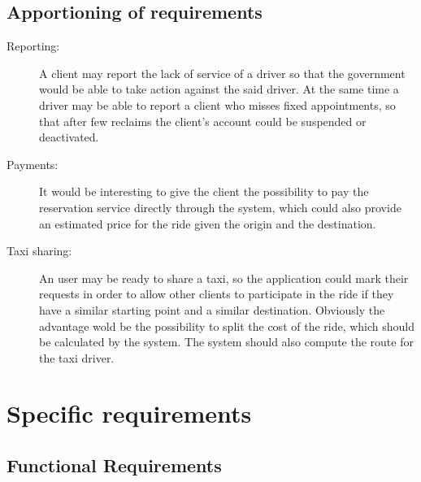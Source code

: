 \documentclass[a4paper]{article}
\let\stdsection\section
\renewcommand\section{\newpage\stdsection}
\begin{document}
\subsection{Apportioning of requirements}
\begin{description}
\item[Reporting:] A client may report the lack of service of a driver so that the government would be able to take action against the said driver. At the same time a driver may be able to report a client who misses fixed appointments, so that after few reclaims the client's account could be suspended or deactivated. 
\item[Payments:] It would be interesting to give the client the possibility to pay the reservation service directly through the system, which could also provide an estimated price for the ride given the origin and the destination.
\item[Taxi sharing:] An user may be ready to share a taxi, so the application could mark their requests in order to allow other clients to participate in the ride if they have a similar starting point and a similar destination. Obviously the advantage wold be the possibility to split the cost of the ride, which should be calculated by the system. The system should also compute the route for the taxi driver.
\end{description}

\section{Specific requirements}

\subsection{Functional Requirements}
\end{document}

